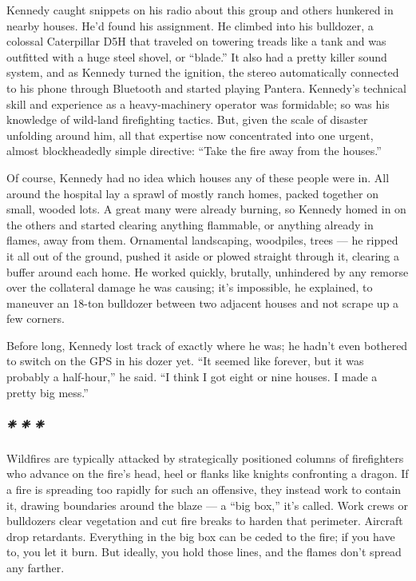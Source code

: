 Kennedy caught snippets on his radio about this group and others
hunkered in nearby houses. He'd found his assignment. He climbed into
his bulldozer, a colossal Caterpillar D5H that traveled on towering
treads like a tank and was outfitted with a huge steel shovel, or
``blade.'' It also had a pretty killer sound system, and as Kennedy
turned the ignition, the stereo automatically connected to his phone
through Bluetooth and started playing Pantera. Kennedy's technical skill
and experience as a heavy-machinery operator was formidable; so was his
knowledge of wild-land firefighting tactics. But, given the scale of
disaster unfolding around him, all that expertise now concentrated into
one urgent, almost blockheadedly simple directive: ``Take the fire away
from the houses.''

Of course, Kennedy had no idea which houses any of these people were in.
All around the hospital lay a sprawl of mostly ranch homes, packed
together on small, wooded lots. A great many were already burning, so
Kennedy homed in on the others and started clearing anything flammable,
or anything already in flames, away from them. Ornamental landscaping,
woodpiles, trees --- he ripped it all out of the ground, pushed it aside
or plowed straight through it, clearing a buffer around each home. He
worked quickly, brutally, unhindered by any remorse over the collateral
damage he was causing; it's impossible, he explained, to maneuver an
18-ton bulldozer between two adjacent houses and not scrape up a few
corners.

Before long, Kennedy lost track of exactly where he was; he hadn't even
bothered to switch on the GPS in his dozer yet. ``It seemed like
forever, but it was probably a half-hour,'' he said. ``I think I got
eight or nine houses. I made a pretty big mess.''

\hypertarget{---6}{%
\subparagraph{❈ ❈ ❈}\label{---6}}

Wildfires are typically attacked by strategically positioned columns of
firefighters who advance on the fire's head, heel or flanks like knights
confronting a dragon. If a fire is spreading too rapidly for such an
offensive, they instead work to contain it, drawing boundaries around
the blaze --- a ``big box,'' it's called. Work crews or bulldozers clear
vegetation and cut fire breaks to harden that perimeter. Aircraft drop
retardants. Everything in the big box can be ceded to the fire; if you
have to, you let it burn. But ideally, you hold those lines, and the
flames don't spread any farther.

